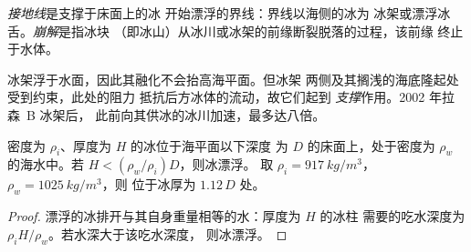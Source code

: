 \begin{definition}[接地线；崩解]\label{def:b3:glaciology:grounding-line}
\emph{接地线}是支撑于床面上的冰
开始漂浮的界线：界线以海侧的冰为
冰架或漂浮冰舌。\emph{崩解}是指冰块
（即冰山）从冰川或冰架的前缘断裂脱落的过程，该前缘
终止于水体。
\end{definition}

冰架浮于水面，因此其融化不会抬高海平面。但冰架
两侧及其搁浅的海底隆起处受到约束，此处的阻力
抵抗后方冰体的流动，故它们起到
\emph{支撑}作用。2002 年拉森~B 冰架后，
此前向其供冰的冰川加速，最多达八倍。

\begin{proposition}[漂浮条件]\label{prop:b3:glaciology:flotation}
密度为 $\rho_i$、厚度为 $H$ 的冰位于海平面以下深度
为 $D$ 的床面上，处于密度为 $\rho_w$ 的海水中。若 $H < (\rho_w/\rho_i)D$，则冰漂浮。
取 $\rho_i = \qty{917}{kg/m^3}$，$\rho_w = \qty{1025}{kg/m^3}$，则
位于冰厚为 $1.12\,D$ 处。
\end{proposition}

\begin{proof}
漂浮的冰排开与其自身重量相等的水：厚度为 $H$ 的冰柱
需要的吃水深度为 $\rho_iH/\rho_w$。若水深大于该吃水深度，
则冰漂浮。
\end{proof}

